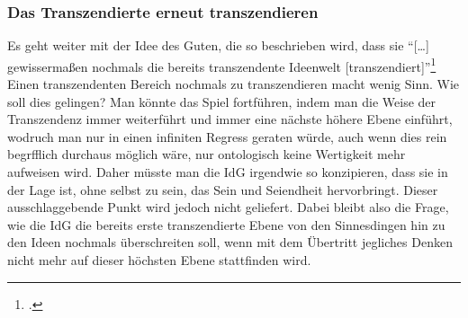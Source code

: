 \subsubsection{Das Transzendierte erneut transzendieren}
Es geht weiter mit der Idee des Guten, die so beschrieben wird, dass sie \enquote{[\dots] gewissermaßen nochmals die bereits transzendente Ideenwelt [transzendiert]}\footcite[vgl.][S. 50]{DisseMetaphysik}
Einen transzendenten Bereich nochmals zu transzendieren macht wenig Sinn. Wie soll dies gelingen? 
Man könnte das Spiel fortführen, indem man die Weise der Transzendenz immer weiterführt und immer eine nächste höhere Ebene einführt, wodruch man nur in einen infiniten Regress geraten würde, auch wenn dies rein begrfflich durchaus möglich wäre, nur ontologisch keine Wertigkeit mehr aufweisen wird. Daher müsste man die IdG irgendwie so konzipieren, dass sie in der Lage ist, ohne selbst zu sein, das Sein und Seiendheit hervorbringt. Dieser ausschlaggebende Punkt wird jedoch nicht geliefert. Dabei bleibt also die Frage, wie die IdG die bereits erste transzendierte Ebene von den Sinnesdingen hin zu den Ideen nochmals überschreiten soll, wenn mit dem Übertritt jegliches Denken nicht mehr auf dieser höchsten Ebene stattfinden wird. 


